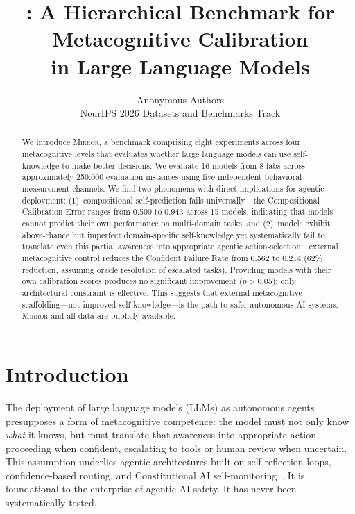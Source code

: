 \documentclass[10pt]{article}
\title{\mirror{}: A Hierarchical Benchmark for Metacognitive Calibration\\in Large Language Models}
\author{
  Anonymous Authors \\
  NeurIPS 2026 Datasets and Benchmarks Track
}
\date{}
\newcommand{\mirror}{\textsc{Mirror}}
\begin{document}
\maketitle

\begin{abstract}
We introduce \mirror{}, a benchmark comprising eight experiments across four
metacognitive levels that evaluates whether large language models can use
self-knowledge to make better decisions. We evaluate 16 models from 8 labs across
approximately 250,000 evaluation instances using five independent behavioral
measurement channels. We find two phenomena with direct implications for agentic
deployment: (1)~compositional self-prediction fails universally---the Compositional
Calibration Error ranges from 0.500 to 0.943 across 15 models, indicating that
models cannot predict their own performance on multi-domain tasks, and (2)~models
exhibit above-chance but imperfect domain-specific self-knowledge yet systematically
fail to translate even this partial awareness into appropriate agentic
action-selection---external metacognitive control reduces the Confident Failure Rate
from 0.562 to 0.214 (62\% reduction, assuming oracle resolution of escalated tasks).
Providing models with their own calibration scores produces no significant
improvement ($p > 0.05$); only architectural constraint is effective. This suggests
that external metacognitive scaffolding---not improved self-knowledge---is the path
to safer autonomous AI systems. \mirror{} and all data are publicly available.
\end{abstract}

\section{Introduction}
\label{sec:intro}

The deployment of large language models (LLMs) as autonomous agents presupposes a
form of metacognitive competence: the model must not only know \textit{what} it
knows, but must translate that awareness into appropriate action---proceeding when
confident, escalating to tools or human review when uncertain. This assumption
underlies agentic architectures built on self-reflection loops, confidence-based
routing, and Constitutional AI self-monitoring~\citep{perez2022sycophancy}. It is
foundational to the enterprise of agentic AI safety. It has never been
systematically tested.
\end{document}
